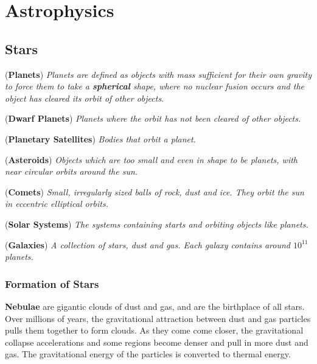 \section{Astrophysics} 

\subsection{Stars}

\begin{definition}{(\textbf{Planets})}
\textit{Planets are defined as objects with mass sufficient for their own gravity to force them to take a \textbf{spherical} shape, where no nuclear fusion occurs and the object has cleared its orbit of other objects.}
\end{definition}
\begin{definition}{(\textbf{Dwarf Planets})}
\textit{Planets where the orbit has not been cleared of other objects.}
\end{definition}
\begin{definition}{(\textbf{Planetary Satellites})}
\textit{Bodies that orbit a planet.}
\end{definition}
\begin{definition}{(\textbf{Asteroids})}
\textit{Objects which are too small and even in shape to be planets, with near circular orbits around the sun.}
\end{definition}
\begin{definition}{(\textbf{Comets})}
\textit{Small, irregularly sized balls of rock, dust and ice. They orbit the sun in eccentric elliptical orbits.}
\end{definition}
\begin{definition}{(\textbf{Solar Systems})}
\textit{The systems containing starts and orbiting objects like planets.}
\end{definition}
\begin{definition}{(\textbf{Galaxies})}
\textit{A collection of stars, dust and gas. Each galaxy contains around $10^{11}$ planets.}
\end{definition}

\subsubsection{Formation of Stars}

\textbf{Nebulae} are gigantic clouds of dust and gas, and are the birthplace of all stars. Over millions of years, the gravitational attraction between dust and gas particles pulls them together to form clouds. As they come come closer, the gravitational collapse accelerations and some regions become denser and pull in more dust and gas. The gravitational energy of the particles is converted to thermal energy. 

